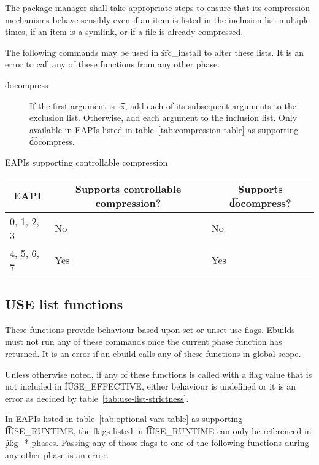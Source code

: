 The package manager shall take appropriate steps to ensure that its compression mechanisms behave
sensibly even if an item is listed in the inclusion list multiple times, if an item is a symlink,
or if a file is already compressed.

The following commands may be used in \t{src_install} to alter these lists. It is an error to call
any of these functions from any other phase.

\begin{description}
\item[docompress] If the first argument is \t{-x}, add each of its subsequent arguments to the
exclusion list. Otherwise, add each argument to the inclusion list. Only available in EAPIs listed
in table~\ref{tab:compression-table} as supporting \t{docompress}.
\end{description}

\begin{centertable}{EAPIs supporting controllable compression}
    \label{tab:compression-table}
    \begin{tabular}{lll}
      \toprule
      \multicolumn{1}{c}{\textbf{EAPI}} &
      \multicolumn{1}{c}{\textbf{Supports controllable compression?}} &
      \multicolumn{1}{c}{\textbf{Supports \t{docompress}?}} \\
      \midrule
      0, 1, 2, 3        & No  & No  \\
      4, 5, 6, 7        & Yes & Yes \\
      \bottomrule
    \end{tabular}
\end{centertable}

\subsection{USE list functions}
These functions provide behaviour based upon set or unset use flags. Ebuilds must not run any of
these commands once the current phase function has returned. It is an error if an ebuild calls any
of these functions in global scope.

Unless otherwise noted, if any of these functions is called with a flag value that is not included
in \t{IUSE_EFFECTIVE}, either behaviour is undefined or it is an error as decided by
table~\ref{tab:use-list-strictness}.

In EAPIs listed in table~\ref{tab:optional-vars-table} as supporting \t{IUSE_RUNTIME}, the flags
listed in \t{IUSE_RUNTIME} can only be referenced in \t{pkg_*} phases. Passing any of those flags
to one of the following functions during any other phase is an error.


